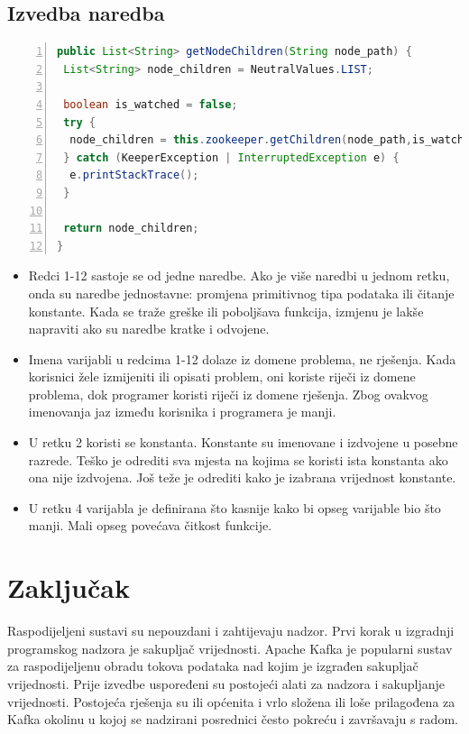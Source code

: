 \documentclass[utf8, diplomski, lmodern, numeric]{fer}
\begin{document}
\newpage
\section{Izvedba naredba}

\begin{lstlisting}[floatplacement=H, language=Java, caption={Razred Kafka ZooKeeper}, captionpos=b, basicstyle=\footnotesize, numbers=left, stepnumber=1, backgroundcolor=\color{backcolour}, keywordstyle=\color{blue}]
public List<String> getNodeChildren(String node_path) {
 List<String> node_children = NeutralValues.LIST;
 
 boolean is_watched = false;
 try {
  node_children = this.zookeeper.getChildren(node_path,is_watched);
 } catch (KeeperException | InterruptedException e) {
  e.printStackTrace();
 }

 return node_children;
}
\end{lstlisting}

\begin{itemize}
    \item Redci 1-12 sastoje se od jedne naredbe. Ako je više naredbi u jednom retku, onda su naredbe jednostavne: promjena primitivnog tipa podataka ili čitanje konstante. Kada se traže greške ili poboljšava funkcija, izmjenu je lakše napraviti ako su naredbe kratke i odvojene.
    \item Imena varijabli u redcima 1-12 dolaze iz domene problema, ne rješenja. Kada korisnici žele izmijeniti ili opisati problem, oni koriste riječi iz domene problema, dok programer koristi riječi iz domene rješenja. Zbog ovakvog imenovanja jaz između korisnika i programera je manji.
    \item U retku 2 koristi se konstanta. Konstante su imenovane i izdvojene u posebne razrede. Teško je odrediti sva mjesta na kojima se koristi ista konstanta ako ona nije izdvojena. Još teže je odrediti kako je izabrana vrijednost konstante.
    \item U retku 4 varijabla je definirana što kasnije kako bi opseg varijable bio što manji. Mali opseg povećava čitkost funkcije.
\end{itemize}



\chapter{Zaključak}

Raspodijeljeni sustavi su nepouzdani i zahtijevaju nadzor. Prvi korak u izgradnji programskog nadzora je sakupljač vrijednosti. Apache Kafka je popularni sustav za raspodijeljenu obradu tokova podataka nad kojim je izgrađen sakupljač vrijednosti. Prije izvedbe uspoređeni su postojeći alati za nadzora i sakupljanje vrijednosti. Postojeća rješenja su ili općenita i vrlo složena ili loše prilagođena za Kafka okolinu u kojoj se nadzirani posrednici često pokreću i završavaju s radom.
\end{document}
